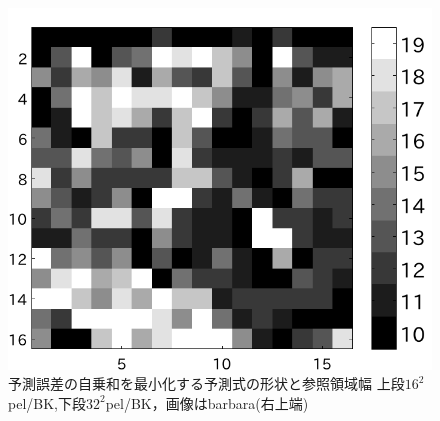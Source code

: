 \documentclass[25pt,landscape,dvipdfmx,uplatex]{foils}
\begin{document}
\begin{figure}[b]
\begin{flushleft}
\includegraphics[angle=-90,scale=0.75]{fig/test1/b32/yosokusikihaba.pdf}\\
予測誤差の自乗和を最小化する予測式の形状と参照領域幅
上段$16^2$pel/BK,下段$32^2$pel/BK，画像はbarbara(右上端)
\end{flushleft}
\end{figure}
\newpage
\end{document}
